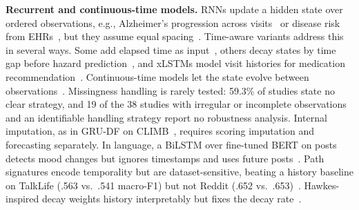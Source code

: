 \documentclass[11pt]{article}
\theoremstyle{plain}
\theoremstyle{definition}
\theoremstyle{remark}
\begin{document}
\noindent\textbf{Recurrent and continuous-time models.} RNNs update a hidden state over ordered observations, e.g., Alzheimer's progression across visits~\citep{8834556,8857827,9098727} or disease risk from EHRs~\citep{wang2019long}, but they assume equal spacing~\citep{perveen2020handling}. Time-aware variants address this in several ways. Some add elapsed time as input~\citep{9006400}, others decay states by time gap before hazard prediction~\citep{11392806}, and xLSTMs model visit histories for medication recommendation~\citep{11670332}. Continuous-time models let the state evolve between observations~\citep{9338417,10890535,zeghlache2024latimlongitudinalrepresentationlearning}. Missingness handling is rarely tested: 59.3\% of studies
state no clear strategy, and 19 of the 38 studies with
irregular or incomplete observations and an identifiable
handling strategy report no robustness analysis. Internal imputation, as in GRU-DF on CLIMB~\citep{9374359}, requires scoring imputation and forecasting separately. In language, a BiLSTM over fine-tuned BERT on posts detects mood changes but ignores timestamps and uses future posts~\citep{tsakalidis-etal-2022-identifying}. Path signatures encode temporality but are dataset-sensitive, beating a history baseline on TalkLife (.563 vs.\ .541 macro-F1) but not Reddit (.652 vs.\ .653)~\citep{tseriotou-etal-2023-sequential}. Hawkes-inspired decay weights history interpretably but fixes the decay rate~\citep{sawhney-etal-2021-suicide,hills2024exciting}.
\end{document}
